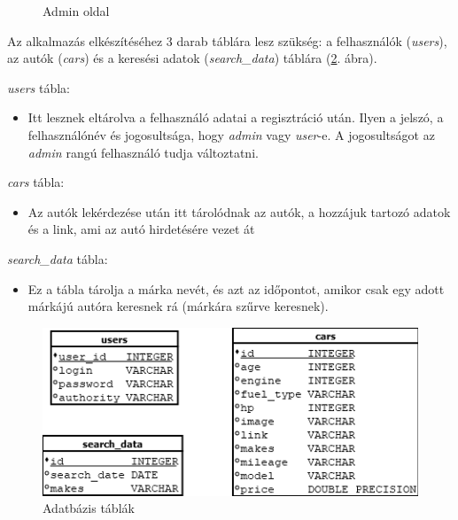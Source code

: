 \begin{figure}[h]
\centering
{}
\caption{Admin oldal}
\label{fig:Admin}
\end{figure}
\newpage


Az alkalmazás elkészítéséhez 3 darab táblára lesz szükség: a
felhasználók (\textit{users}), az autók (\textit{cars}) és a keresési adatok (\textit{search\_data}) táblára (\ref{fig:DataTable}. ábra).

\medskip
\textit{users} tábla:
\begin{itemize}
\item Itt lesznek eltárolva a felhasználó adatai a regisztráció után. Ilyen a jelszó, a felhasználónév és jogosultsága, hogy \textit{admin} vagy \textit{user}-e. A jogosultságot az \textit{admin} rangú felhasználó tudja változtatni.
\end{itemize}

\textit{cars} tábla:
\begin{itemize}
\item Az autók lekérdezése után itt tárolódnak az autók,  a hozzájuk tartozó adatok és a link, ami az autó hirdetésére vezet át
\end{itemize}

\textit{search\_data} tábla:
\begin{itemize}
\item Ez a tábla tárolja a márka nevét, és azt az időpontot, amikor csak egy adott márkájú autóra keresnek rá (márkára szűrve keresnek).
\end{itemize}
 
 \begin{figure}[h]
\centering
\includegraphics[scale=0.7]{images/Data_Table.png}
\caption{Adatbázis táblák}
\label{fig:DataTable}
\end{figure}

